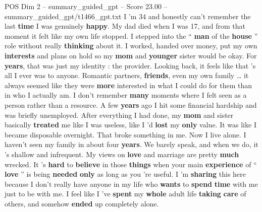 \begin{textsample}{POS Dim 2 – summary\_guided\_gpt – Score 23.00 – summary\_guided\_gpt/t1466\_gpt.txt}  \label{ex:f2_pos_013}
I ’m 34 and honestly can't remember the last \textbf{time} I was genuinely \textbf{happy}.
My dad died when I was 17, and from that moment it felt like my own life stopped.
I stepped into the “ \textbf{man} of the \textbf{house} ” role without really \textbf{thinking} about it.
I worked, handed over money, put my own \textbf{interests} and plans on hold so my \textbf{mom} and \textbf{younger} sister would be okay.
For \textbf{years}, that was just my identity : the provider.
Looking back, it feels like that ’s all I ever was to anyone.
Romantic partners, \textbf{friends}, even my own family … it always seemed like they were \textbf{more} interested in what I could do for them than in who I actually am.
I don't remember \textbf{many} moments where I felt seen as a person rather than a resource.
A few \textbf{years} ago I hit some financial hardship and was briefly unemployed.
After everything I had done, my \textbf{mom} and sister basically \textbf{treated} me like I was useless, like I ’d \textbf{lost} my \textbf{only} value.
It was like I became disposable overnight.
That broke something in me.
Now I live alone.
I haven't seen my family in about four \textbf{years}.
We barely speak, and when we do, it ’s shallow and infrequent.
My views on \textbf{love} and marriage are pretty \textbf{much} wrecked.
It ’s \textbf{hard} to \textbf{believe} in those \textbf{things} when your main \textbf{experience} of “ \textbf{love} ” is being \textbf{needed} \textbf{only} as long as you ’re useful.
I ’m \textbf{sharing} this here because I don't really have anyone in my life who \textbf{wants} to \textbf{spend} \textbf{time} with me just to be with me.
I feel like I ’ve \textbf{spent} my \textbf{whole} adult life \textbf{taking} \textbf{care} of others, and somehow \textbf{ended} up completely alone.

\end{textsample}
